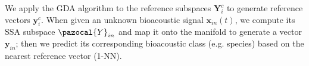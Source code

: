 We apply the GDA algorithm to the reference subspaces $\bm{Y}_{i}^{c}$ to generate reference vectors $\bm{y}_{i}^{c}$. When given an unknown bioacoustic signal $\bm{x}_{in}(t)$, we compute its SSA subspace $\pazocal{Y}_{in}$ and map it onto the manifold to generate a vector $\bm{y}_{in}$; then we predict its corresponding bioacoustic class (e.g. species)  based on the nearest reference vector (1-NN).








